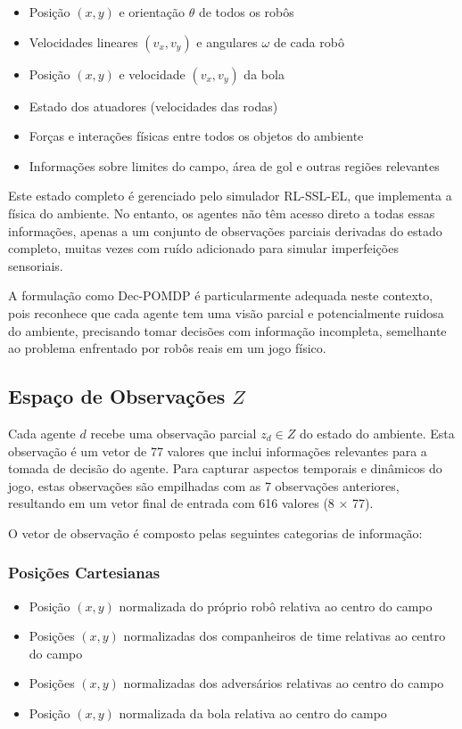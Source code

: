 \begin{itemize}
    \item Posição $(x, y)$ e orientação $\theta$ de todos os robôs
    \item Velocidades lineares $(v_x, v_y)$ e angulares $\omega$ de cada robô
    \item Posição $(x, y)$ e velocidade $(v_x, v_y)$ da bola
    \item Estado dos atuadores (velocidades das rodas)
    \item Forças e interações físicas entre todos os objetos do ambiente
    \item Informações sobre limites do campo, área de gol e outras regiões relevantes
\end{itemize}

Este estado completo é gerenciado pelo simulador RL-SSL-EL, que implementa a física do ambiente. No entanto, os agentes não têm acesso direto a todas essas informações, apenas a um conjunto de observações parciais derivadas do estado completo, muitas vezes com ruído adicionado para simular imperfeições sensoriais.

A formulação como Dec-POMDP é particularmente adequada neste contexto, pois reconhece que cada agente tem uma visão parcial e potencialmente ruidosa do ambiente, precisando tomar decisões com informação incompleta, semelhante ao problema enfrentado por robôs reais em um jogo físico.

\subsection{Espaço de Observações $Z$}

Cada agente $d$ recebe uma observação parcial $z_d \in Z$ do estado do ambiente. Esta observação é um vetor de 77 valores que inclui informações relevantes para a tomada de decisão do agente. Para capturar aspectos temporais e dinâmicos do jogo, estas observações são empilhadas com as 7 observações anteriores, resultando em um vetor final de entrada com 616 valores (8 × 77).

O vetor de observação é composto pelas seguintes categorias de informação:

\subsubsection{Posições Cartesianas}
\begin{itemize}
    \item Posição $(x, y)$ normalizada do próprio robô relativa ao centro do campo
    \item Posições $(x, y)$ normalizadas dos companheiros de time relativas ao centro do campo
    \item Posições $(x, y)$ normalizadas dos adversários relativas ao centro do campo
    \item Posição $(x, y)$ normalizada da bola relativa ao centro do campo
\end{itemize}

